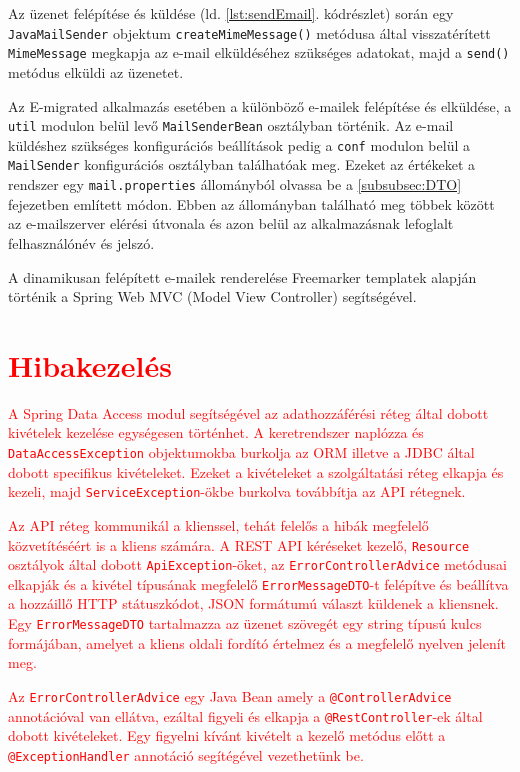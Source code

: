 Az üzenet felépítése és küldése (ld. \ref{lst:sendEmail}. kódrészlet) során egy \texttt{JavaMailSender} objektum \texttt{createMimeMessage()} metódusa által visszatérített \texttt{MimeMessage} megkapja az e-mail elküldéséhez szükséges adatokat, majd a \texttt{send()} metódus elküldi az üzenetet. 

Az E-migrated alkalmazás esetében a különböző e-mailek felépítése és elküldése, a \texttt{util} modulon belül levő \texttt{MailSenderBean} osztályban történik. Az e-mail küldéshez szükséges konfigurációs beállítások pedig a \texttt{conf} modulon belül a \texttt{MailSender} konfigurációs osztályban találhatóak meg. Ezeket az értékeket a rendszer egy \texttt{mail.properties} állományból olvassa be a \ref{subsubsec:DTO} fejezetben említett módon. Ebben az állományban található meg többek között az e-mailszerver elérési útvonala és azon belül az alkalmazásnak lefoglalt felhasználónév és jelszó.

A dinamikusan felépített e-mailek renderelése Freemarker templatek alapján történik a Spring Web MVC (Model View Controller) segítségével.



\section{\textcolor{red}{Hibakezelés}}
\label{sec:hibakezeles}

\textcolor{red}{A Spring Data Access modul segítségével az adathozzáférési réteg által dobott kivételek kezelése egységesen történhet. A keretrendszer naplózza és \texttt{DataAccessException} objektumokba burkolja az ORM illetve a JDBC által dobott specifikus kivételeket. Ezeket a kivételeket a szolgáltatási réteg elkapja és kezeli, majd \texttt{ServiceException}-ökbe burkolva továbbítja az API rétegnek. }

\textcolor{red}{Az API réteg kommunikál a klienssel, tehát felelős a hibák megfelelő közvetítéséért is a kliens számára. A REST API kéréseket kezelő, \texttt{Resource} osztályok által dobott \texttt{ApiException}-öket,  az \texttt{ErrorControllerAdvice} metódusai elkapják és a kivétel típusának megfelelő \texttt{ErrorMessageDTO}-t felépítve és beállítva a hozzáillő HTTP státuszkódot, JSON formátumú választ küldenek a kliensnek. Egy \texttt{ErrorMessageDTO} tartalmazza az üzenet szövegét egy string típusú kulcs formájában, amelyet a kliens oldali fordító értelmez és a megfelelő nyelven jelenít meg. }

\textcolor{red}{Az \texttt{ErrorControllerAdvice} egy Java Bean amely a \texttt{@ControllerAdvice} annotációval van ellátva, ezáltal figyeli és elkapja a \texttt{@RestController}-ek által dobott kivételeket. Egy figyelni kívánt kivételt a kezelő metódus előtt a  \texttt{@ExceptionHandler} annotáció segítégével vezethetünk be. }

